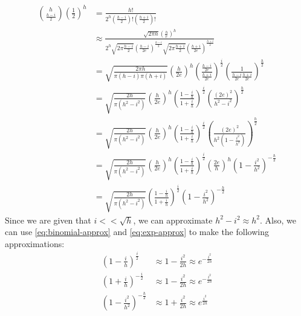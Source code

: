 \begin{align*}
	\binom{h}{\frac{h-i}{2}}\left(\frac{1}{2}\right)^h & = \frac{h!}{2^h\left(\frac{h-i}{2}\right)!\left(\frac{h+i}{2}\right)!}                                                                                                                                         \\
	                                                   & \approx \frac{\sqrt{2\pi h}\left(\frac{h}{e}\right)^h}{2^h\sqrt{2\pi \frac{h-i}{2}}\left(\frac{h-i}{2e}\right)^\frac{h-i}{2}\sqrt{2\pi \frac{h+i}{2}}\left(\frac{h+i}{2e}\right)^\frac{h+i}{2}}                \\
	                                                   & = \sqrt{\frac{2\pi h}{\pi(h-i)\pi(h+i)} }\left(\frac{h}{2e}\right)^h \left(\frac{\frac{h-i}{2e}}{\frac{h+i}{2e}}\right)^\frac{i}{2}\left(\frac{1}{\frac{h-i}{2e} \frac{h+i}{2e}}\right)^\frac{h}{2}            \\
	                                                   & = \sqrt{\frac{2 h}{\pi \left(h^2-i^2\right)}}\left(\frac{h}{2e}\right)^h \left(\frac{1-\frac{i}{h}}{1+\frac{i}{h}}\right)^\frac{i}{2}\left(\frac{(2e)^2}{h^2-i^2}\right)^\frac{h}{2}                           \\
	                                                   & = \sqrt{\frac{2 h}{\pi \left(h^2-i^2\right)}}\left(\frac{h}{2e}\right)^h \left(\frac{1-\frac{i}{h}}{1+\frac{i}{h}}\right)^\frac{i}{2}\left(\frac{(2e)^2}{h^2\left(1-\frac{i^2}{h^2}\right)}\right)^\frac{h}{2} \\
	                                                   & = \sqrt{\frac{2 h}{\pi \left(h^2-i^2\right)}}\left(\frac{h}{2e}\right)^h \left(\frac{1-\frac{i}{h}}{1+\frac{i}{h}}\right)^\frac{i}{2}\left(\frac{2e}{h}\right)^h\left(1-\frac{i^2}{h^2}\right)^{-\frac{h}{2}}  \\
	                                                   & = \sqrt{\frac{2 h}{\pi \left(h^2-i^2\right)}} \left(\frac{1-\frac{i}{h}}{1+\frac{i}{h}}\right)^\frac{i}{2}\left(1-\frac{i^2}{h^2}\right)^{-\frac{h}{2}}
\end{align*}
Since we are given that $i << \sqrt{h}$, we can approximate $h^2-i^2 \approx h^2$. Also, we can use \cref{eq:binomial-approx} and \cref{eq:exp-approx} to make the following approximations:
\begin{align*}
	\left(1-\frac{i}{h}\right)^\frac{i}{2}        & \approx 1-\frac{i^2}{2h}  \approx e^{-\frac{i^2}{2h}}  \\
	\left(1+\frac{i}{h}\right)^{-\frac{i}{2}}     & \approx 1 - \frac{i^2}{2h} \approx e^{-\frac{i^2}{2h}} \\
	\left(1-\frac{i^2}{h^2}\right)^{-\frac{h}{2}} & \approx 1 + \frac{i^2}{2h} \approx e^\frac{i^2}{2h}
\end{align*}
